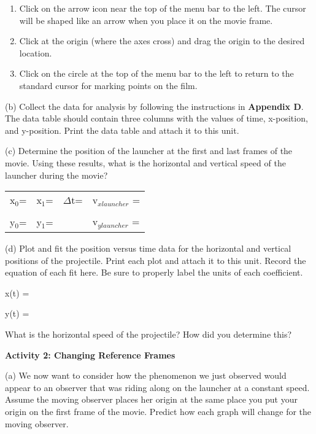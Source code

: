 \begin{enumerate}
\item Click on the arrow icon near the top of the menu bar to the left.
The cursor will be shaped like an arrow when you place it on the movie
frame.
\item Click at the origin (where the axes cross) and drag the origin to
the desired location.
\item Click on the circle at the top of the menu bar to the left to return
to the standard cursor for marking points on the film.
\end{enumerate}
(b) Collect the data for analysis by following the instructions in
\textbf{Appendix D}. The data table should contain three columns with
the values of time, x-position, and y-position. Print the data table
and attach it to this unit.

(c) Determine the position of the launcher at the first and last frames
of the movie. Using these results, what is the horizontal and vertical
speed of the launcher during the movie?

\vspace{0.3cm}
{\centering \begin{tabular}{p{20mm}p{20mm}p{30mm}p{70mm}}
x\( _{0} \)= &
x\( _{1} \)=&
\( \Delta  \)t=&
v\( _{xlauncher} \) =\\
&
&
&
\\
y\( _{0} \)=&
y\( _{1} \)= &
&
v\( _{ylauncher} \) =\\
\end{tabular}\par}
\vspace{0.3cm}

(d) Plot and fit the position versus time data for the horizontal
and vertical positions of the projectile. Print each
plot and attach it to this unit. Record the equation of each fit here.
Be sure to properly label the units of each coefficient.

x(t) =
\vspace*{5mm}

y(t) =
\vspace{5mm}

What is the horizontal speed of the projectile? How did you determine
this?
\vspace{2in}

\textbf{Activity 2: Changing Reference Frames}

(a) We now want to consider how the phenomenon we just observed would
appear to an observer that was riding along on the launcher at a constant
speed. Assume the moving observer places her origin at the same place
you put your origin on the first frame of the movie. Predict how each
graph will change for the moving observer.

